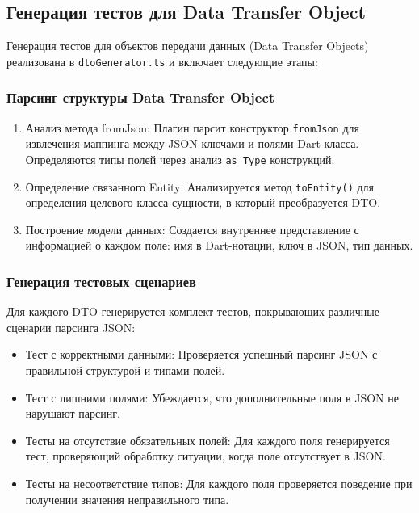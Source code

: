 \documentclass[14pt, russian]{scrartcl}
\begin{document}
\subsection{Генерация тестов для Data Transfer Object}

Генерация тестов для объектов передачи данных (Data Transfer Objects) реализована в \texttt{dtoGenerator.ts} и включает следующие этапы:

\subsubsection{Парсинг структуры Data Transfer Object}

\begin{enumerate}
    \item Анализ метода fromJson: Плагин парсит конструктор \texttt{fromJson} для извлечения маппинга между JSON-ключами и полями Dart-класса. Определяются типы полей через анализ \texttt{as Type} конструкций.
    \item Определение связанного Entity: Анализируется метод \texttt{toEntity()} для определения целевого класса-сущности, в который преобразуется DTO.
    \item Построение модели данных: Создается внутреннее представление с информацией о каждом поле: имя в Dart-нотации, ключ в JSON, тип данных.
\end{enumerate}

\subsubsection{Генерация тестовых сценариев}

Для каждого DTO генерируется комплект тестов, покрывающих различные сценарии парсинга JSON:

\begin{itemize}
    \item Тест с корректными данными: Проверяется успешный парсинг JSON с правильной структурой и типами полей.
    \item Тест с лишними полями: Убеждается, что дополнительные поля в JSON не нарушают парсинг.
    \item Тесты на отсутствие обязательных полей: Для каждого поля генерируется тест, проверяющий обработку ситуации, когда поле отсутствует в JSON.
    \item Тесты на несоответствие типов: Для каждого поля проверяется поведение при получении значения неправильного типа.
\end{itemize}
\end{document}
